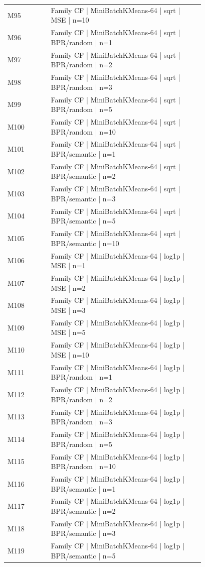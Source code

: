 \begin{longtable}{lp{0.78\linewidth}}
M95 & Family CF | MiniBatchKMeans-64 | sqrt | MSE | n=10 \\
M96 & Family CF | MiniBatchKMeans-64 | sqrt | BPR/random | n=1 \\
M97 & Family CF | MiniBatchKMeans-64 | sqrt | BPR/random | n=2 \\
M98 & Family CF | MiniBatchKMeans-64 | sqrt | BPR/random | n=3 \\
M99 & Family CF | MiniBatchKMeans-64 | sqrt | BPR/random | n=5 \\
M100 & Family CF | MiniBatchKMeans-64 | sqrt | BPR/random | n=10 \\
M101 & Family CF | MiniBatchKMeans-64 | sqrt | BPR/semantic | n=1 \\
M102 & Family CF | MiniBatchKMeans-64 | sqrt | BPR/semantic | n=2 \\
M103 & Family CF | MiniBatchKMeans-64 | sqrt | BPR/semantic | n=3 \\
M104 & Family CF | MiniBatchKMeans-64 | sqrt | BPR/semantic | n=5 \\
M105 & Family CF | MiniBatchKMeans-64 | sqrt | BPR/semantic | n=10 \\
M106 & Family CF | MiniBatchKMeans-64 | log1p | MSE | n=1 \\
M107 & Family CF | MiniBatchKMeans-64 | log1p | MSE | n=2 \\
M108 & Family CF | MiniBatchKMeans-64 | log1p | MSE | n=3 \\
M109 & Family CF | MiniBatchKMeans-64 | log1p | MSE | n=5 \\
M110 & Family CF | MiniBatchKMeans-64 | log1p | MSE | n=10 \\
M111 & Family CF | MiniBatchKMeans-64 | log1p | BPR/random | n=1 \\
M112 & Family CF | MiniBatchKMeans-64 | log1p | BPR/random | n=2 \\
M113 & Family CF | MiniBatchKMeans-64 | log1p | BPR/random | n=3 \\
M114 & Family CF | MiniBatchKMeans-64 | log1p | BPR/random | n=5 \\
M115 & Family CF | MiniBatchKMeans-64 | log1p | BPR/random | n=10 \\
M116 & Family CF | MiniBatchKMeans-64 | log1p | BPR/semantic | n=1 \\
M117 & Family CF | MiniBatchKMeans-64 | log1p | BPR/semantic | n=2 \\
M118 & Family CF | MiniBatchKMeans-64 | log1p | BPR/semantic | n=3 \\
M119 & Family CF | MiniBatchKMeans-64 | log1p | BPR/semantic | n=5 \\

\end{longtable}
